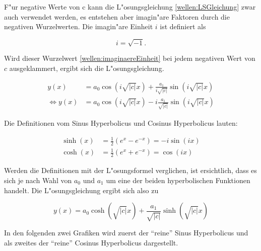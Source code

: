 \begin{refsection}
F"ur negative Werte von c kann die L"osungsgleichung \ref{wellen:LSGleichung} 
zwar auch verwendet werden, es entstehen aber imagin"are Faktoren durch die 
negativen Wurzelwerten. Die imagin"are Einheit $i$ ist definiert als

\begin{equation}
	i = \sqrt{-1}.
	\label{wellen:imaginaereEinheit}
\end{equation}

Wird dieser Wurzelwert \ref{wellen:imaginaereEinheit} bei jedem negativen Wert 
von $c$ ausgeklammert, ergibt sich die L"osungsgleichung.

\begin{equation}
	\begin{split}
	y(x) &= a_0 \cos(i\sqrt{|c|}x) + \frac{a_1}{i\sqrt{|c|}}\sin(i\sqrt{|c|}x) 
	\\
	\Leftrightarrow
	y(x) &= a_0 \cos(i\sqrt{|c|}x) - i\frac{a_1}{\sqrt{|c|}}\sin(i\sqrt{|c|}x)
	\end{split}	
	\label{wellen:LSGnegcWerte}
\end{equation}

Die Definitionen vom Sinus Hyperbolicus und Cosinus Hyperbolicus lauten:

\begin{equation*}
	\begin{split}
	\sinh(x) &= \frac{1}{2} (e^x - e^{-x}) = -i \sin(ix)\\
	\cosh(x) &= \frac{1}{2} (e^x + e^{-x}) = \cos (ix)
	\end{split}
\end{equation*}

Werden die Definitionen mit der L"osungsformel verglichen, ist ersichtlich, 
dass es sich je nach Wahl von $a_0$ und $a_1$ um eine der beiden hyperbolischen 
Funktionen handelt. Die L"osungsgleichung ergibt sich also zu

\begin{equation}
	y(x) = a_0 \cosh(\sqrt{|c|}x) + \frac{a_1}{\sqrt{|c|}}\sinh(\sqrt{|c|}x)
	\label{wellen:LSGhyperbolFunktion}
\end{equation}

In den folgenden zwei Grafiken wird zuerst der ``reine'' Sinus Hyperbolicus und 
als zweites der ``reine'' Cosinus Hyperbolicus dargestellt.


\end{refsection}
